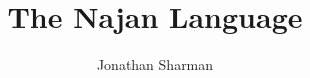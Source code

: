 \NewDocumentCommand{\down}{}{$\Downarrow$ \\}

\title{ \\ The Najan Language}
\author{Jonathan Sharman}



\listoftodos

\maketitle

\tableofcontents

\twocolumn












\begin{appendices}
	
\end{appendices}


